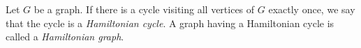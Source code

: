 \documentclass[12pt]{article}
\begin{document}
Let $G$ be a graph. If there is a cycle visiting all vertices of $G$ exactly once, we say that the cycle is a \emph{Hamiltonian cycle}.  A graph having a Hamiltonian cycle is called a \emph{Hamiltonian graph}.
\end{document}
